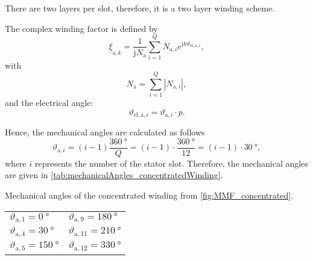 \begin{solutionblock}
    There are two layers per slot, therefore, it is a two layer winding scheme.
\end{solutionblock}


\begin{solutionblock}
    The complex winding factor is defined by
    \begin{equation}
        \underline{\xi}_{\mathrm{a,}k} = \frac{1}{\mathrm{j}N_{\mathrm{a}}} \sum_{i=1}^{Q} N_{\mathrm{a,}i}e^{\mathrm{j}k\vartheta_{\mathrm{el,a,}i}},
        \label{eq:complexWindingFactor_concentratedWinding}
    \end{equation}
    with
    \begin{equation}
        N_{\mathrm{a}} = \sum_{i=1}^{Q} |N_{\mathrm{a,}i} |,
    \end{equation}
    and the electrical angle:
    \begin{equation}
        \vartheta_{\mathrm{el,a,}i} = \vartheta_{\mathrm{a,}i} \cdot p.
    \end{equation}

    Hence, the mechanical angles are calculated as follows
    \begin{equation}
        \vartheta_{\mathrm{a,}i} = \left(i-1 \right) \frac{\SI{360}{\degree}}{Q}
        = \left(i-1 \right) \cdot \frac{\SI{360}{\degree}}{12}
        = \left(i-1 \right)\cdot \SI{30}{\degree},
    \end{equation}
    where $i$ represents the number of the stator slot.
    Therefore, the mechanical angles are given in \autoref{tab:mechanicalAngles_concentratedWinding}.
    \begin{solutiontable}[ht]
        \caption{Mechanical angles of the concentrated winding from \autoref{fig:MMF_concentrated}.}
        \centering
        \begin{tabular}{C{3cm}|C{3cm}}\toprule
            $\vartheta_{\mathrm{a,}1} = \SI{0}{\degree}$   & $\vartheta_{\mathrm{a,}9} = \SI{180}{\degree}$  \\
            $\vartheta_{\mathrm{a,}4} = \SI{30}{\degree}$  & $\vartheta_{\mathrm{a,}11} = \SI{210}{\degree}$ \\
            $\vartheta_{\mathrm{a,}5} = \SI{150}{\degree}$ & $\vartheta_{\mathrm{a,}12} = \SI{330}{\degree}$ \\
            \bottomrule
        \end{tabular}
        \label{tab:mechanicalAngles_concentratedWinding}
    \end{solutiontable}


\end{solutionblock}
